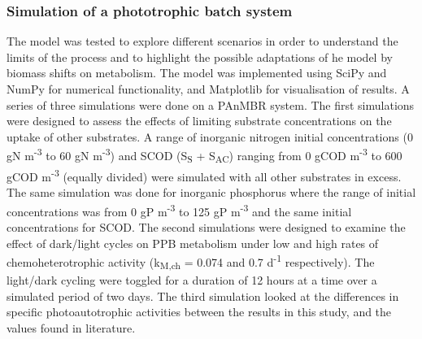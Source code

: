 \subsubsection{Simulation of a phototrophic batch system}
The model was tested to explore different scenarios in order to understand the limits of the process and to highlight the possible adaptations of he model by biomass shifts on metabolism. The model was implemented using SciPy \cite{Scipy2001} and NumPy \cite{NumPy2011} for numerical functionality, and Matplotlib \cite{Hunter2007a} for visualisation of results. A series of three simulations were done on a PAnMBR system.
\skippingparagraph
The first simulations were designed to assess the effects of limiting substrate concentrations on the uptake of other substrates. A range of inorganic nitrogen initial concentrations (0 gN m\textsuperscript{-3} to 60 gN m\textsuperscript{-3}) and SCOD (S\textsubscript{S} + S\textsubscript{AC}) ranging from 0 gCOD m\textsuperscript{-3} to 600 gCOD m\textsuperscript{-3} (equally divided) were simulated with all other substrates in excess. The same simulation was done for inorganic phosphorus where the range of initial concentrations was from 0 gP m\textsuperscript{-3} to 125 gP m\textsuperscript{-3} and the same initial concentrations for SCOD. 
\skippingparagraph
The second simulations were designed to examine the effect of dark/light cycles on PPB metabolism under low and high rates of chemoheterotrophic activity (k\textsubscript{M,ch} = 0.074 and 0.7 d\textsuperscript{-1} respectively). The light/dark cycling were toggled for a duration of 12 hours at a time over a simulated period of two days. 
\skippingparagraph
The third simulation looked at the differences in specific photoautotrophic activities between the results in this study, and the values found in literature.



